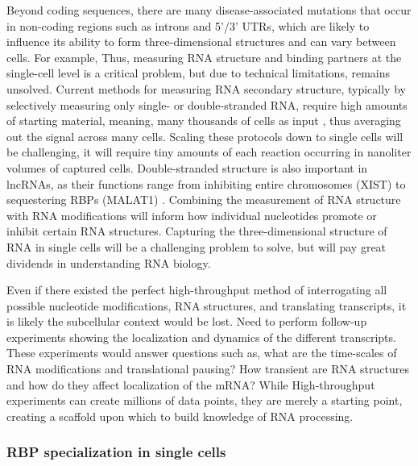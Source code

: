 Beyond coding sequences, there are many disease-associated mutations that occur in non-coding regions such as introns and 5'/3' UTRs, which are likely to influence its ability to form three-dimensional structures and can vary between cells. For example,  Thus, measuring RNA structure and binding partners at the single-cell level is a critical problem, but due to technical limitations, remains unsolved. Current methods for measuring RNA secondary structure, typically by selectively measuring only single- or double-stranded RNA, require high amounts of starting material, meaning, many thousands of cells as input \cite{Bevilacqua2016-gy,Flynn2016-am,Kubota2015-oj,Rouskin2014-uf,Spitale2013-aq,Wan2011-uw,Wan2014-sk}, thus averaging out the signal across many cells. Scaling these protocols down to single cells will be challenging, it will require tiny amounts of each reaction occurring in nanoliter volumes of captured cells. Double-stranded structure is also important in lncRNAs, as their functions range from inhibiting entire chromosomes (XIST) to sequestering RBPs (MALAT1) \cite{Engreitz:2016by}. Combining the measurement of RNA structure with RNA modifications will inform how individual nucleotides promote or inhibit certain RNA structures. Capturing the three-dimensional structure of RNA in single cells will be a challenging problem to solve, but will pay great dividends in understanding RNA biology.

Even if there existed the perfect high-throughput method of interrogating all possible nucleotide modifications, RNA structures, and translating transcripts, it is likely the subcellular context would be lost. Need to perform follow-up experiments showing the localization and dynamics of the different transcripts. These experiments would answer questions such as, what are the time-scales of RNA modifications and translational pausing? How transient are RNA structures and how do they affect localization of the mRNA? While High-throughput experiments can create millions of data points, they are merely a starting point, creating a scaffold upon which to build knowledge of RNA processing.


\subsubsection{RBP specialization in single cells}

